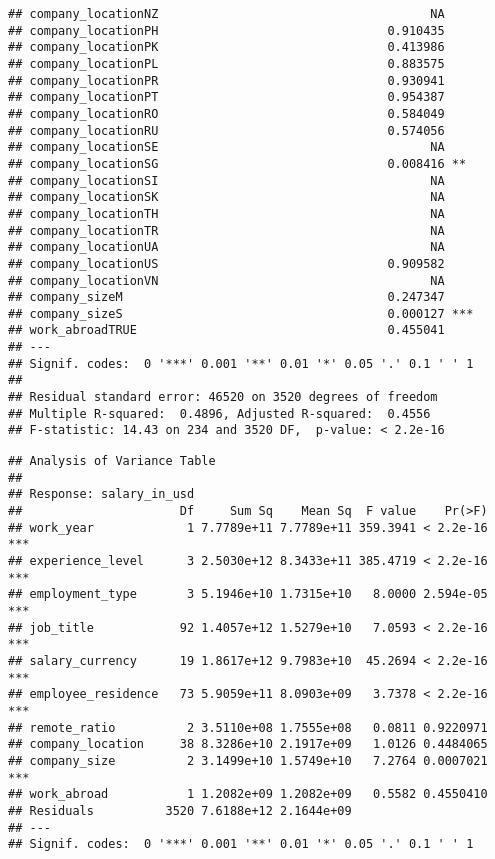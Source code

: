 \documentclass[
]{article}
\begin{document}
\begin{verbatim}
## company_locationNZ                                      NA    
## company_locationPH                                0.910435    
## company_locationPK                                0.413986    
## company_locationPL                                0.883575    
## company_locationPR                                0.930941    
## company_locationPT                                0.954387    
## company_locationRO                                0.584049    
## company_locationRU                                0.574056    
## company_locationSE                                      NA    
## company_locationSG                                0.008416 ** 
## company_locationSI                                      NA    
## company_locationSK                                      NA    
## company_locationTH                                      NA    
## company_locationTR                                      NA    
## company_locationUA                                      NA    
## company_locationUS                                0.909582    
## company_locationVN                                      NA    
## company_sizeM                                     0.247347    
## company_sizeS                                     0.000127 ***
## work_abroadTRUE                                   0.455041    
## ---
## Signif. codes:  0 '***' 0.001 '**' 0.01 '*' 0.05 '.' 0.1 ' ' 1
## 
## Residual standard error: 46520 on 3520 degrees of freedom
## Multiple R-squared:  0.4896, Adjusted R-squared:  0.4556 
## F-statistic: 14.43 on 234 and 3520 DF,  p-value: < 2.2e-16
\end{verbatim}

\begin{verbatim}
## Analysis of Variance Table
## 
## Response: salary_in_usd
##                      Df     Sum Sq    Mean Sq  F value    Pr(>F)    
## work_year             1 7.7789e+11 7.7789e+11 359.3941 < 2.2e-16 ***
## experience_level      3 2.5030e+12 8.3433e+11 385.4719 < 2.2e-16 ***
## employment_type       3 5.1946e+10 1.7315e+10   8.0000 2.594e-05 ***
## job_title            92 1.4057e+12 1.5279e+10   7.0593 < 2.2e-16 ***
## salary_currency      19 1.8617e+12 9.7983e+10  45.2694 < 2.2e-16 ***
## employee_residence   73 5.9059e+11 8.0903e+09   3.7378 < 2.2e-16 ***
## remote_ratio          2 3.5110e+08 1.7555e+08   0.0811 0.9220971    
## company_location     38 8.3286e+10 2.1917e+09   1.0126 0.4484065    
## company_size          2 3.1499e+10 1.5749e+10   7.2764 0.0007021 ***
## work_abroad           1 1.2082e+09 1.2082e+09   0.5582 0.4550410    
## Residuals          3520 7.6188e+12 2.1644e+09                       
## ---
## Signif. codes:  0 '***' 0.001 '**' 0.01 '*' 0.05 '.' 0.1 ' ' 1
\end{verbatim}
\end{document}

